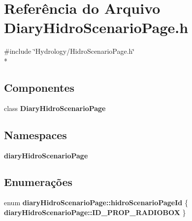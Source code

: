 \section{Referência do Arquivo Diary\+Hidro\+Scenario\+Page.\+h}
\label{_diary_hidro_scenario_page_8h}
{\ttfamily \#include \char`\"{}Hydrology/\+Hidro\+Scenario\+Page.\+h\char`\"{}}\\*
\subsection*{Componentes}
\begin{DoxyCompactItemize}
\item 
class {\bf Diary\+Hidro\+Scenario\+Page}
\end{DoxyCompactItemize}
\subsection*{Namespaces}
\begin{DoxyCompactItemize}
\item 
 {\bf diary\+Hidro\+Scenario\+Page}
\end{DoxyCompactItemize}
\subsection*{Enumerações}
\begin{DoxyCompactItemize}
\item 
enum {\bf diary\+Hidro\+Scenario\+Page\+::hidro\+Scenario\+Page\+Id} \{ {\bf diary\+Hidro\+Scenario\+Page\+::\+I\+D\+\_\+\+P\+R\+O\+P\+\_\+\+R\+A\+D\+I\+O\+B\+OX}
 \}
\end{DoxyCompactItemize}
